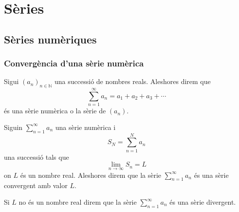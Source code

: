 \documentclass[../../Main.tex]{subfiles}
\begin{document}
\chapter{Sèries}
\section{Sèries numèriques}
	\subsection{Convergència d'una sèrie numèrica}
	\begin{definition}
		\label{def:sèrie numèrica}
		Sigui \((a_{n})_{n\in\mathbb{N}}\) una successió de nombres reals. Aleshores direm que
		\[\sum_{n=1}^{\infty}a_{n}=a_{1}+a_{2}+a_{3}+\cdots\]
		és una sèrie numèrica o la sèrie de \((a_{n})\).
	\end{definition}
	\begin{definition}
		\label{def:sèrie convergent}
		\label{def:sèrie divergent}
		Siguin \(\sum_{n=1}^{\infty}a_{n}\) una sèrie numèrica i
		\[S_{N}=\sum_{n=1}^{N}a_{n}\]
		una successió tals que
		\[\lim_{n\to\infty}S_{n}=L\]
		on \(L\) és un nombre real. Aleshores direm que la sèrie \(\sum_{n=1}^{\infty}a_{n}\) és una sèrie convergent amb valor \(L\).
		
		Si \(L\) no és un nombre real direm que la sèrie \(\sum_{n=1}^{\infty}a_{n}\) és una sèrie divergent.
	\end{definition}
\end{document}
